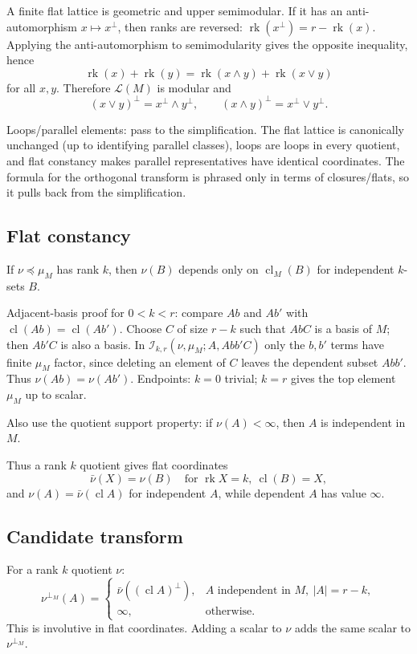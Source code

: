 \documentclass[12pt]{article}
\newcommand{\rk}{\operatorname{rk}}
\newcommand{\cl}{\operatorname{cl}}
\newcommand{\cL}{\mathcal L}
\begin{document}
A finite flat lattice is geometric and upper semimodular.  If it has
an anti-automorphism $x\mapsto x^\perp$, then ranks are reversed:
$\rk(x^\perp)=r-\rk(x)$.  Applying the anti-automorphism to
semimodularity gives the opposite inequality, hence
\[
\rk(x)+\rk(y)=\rk(x\wedge y)+\rk(x\vee y)
\]
for all $x,y$.  Therefore $\cL(M)$ is modular and
\[
(x\vee y)^\perp=x^\perp\wedge y^\perp,\qquad
(x\wedge y)^\perp=x^\perp\vee y^\perp.
\]

Loops/parallel elements: pass to the simplification.  The flat lattice
is canonically unchanged (up to identifying parallel classes), loops
are loops in every quotient, and flat constancy makes parallel
representatives have identical coordinates.  The formula for the
orthogonal transform is phrased only in terms of closures/flats, so it
pulls back from the simplification.

\subsection*{Flat constancy}

If $\nu\preceq\mu_M$ has rank $k$, then $\nu(B)$ depends only on
$\cl_M(B)$ for independent $k$-sets $B$.

Adjacent-basis proof for $0<k<r$: compare $A b$ and $A b'$ with
$\cl(A b)=\cl(A b')$.  Choose $C$ of size $r-k$ such that $A b C$ is
a basis of $M$; then $A b' C$ is also a basis.  In
$\mathcal I_{k,r}(\nu,\mu_M;A,A b b' C)$ only the $b,b'$ terms have
finite $\mu_M$ factor, since deleting an element of $C$ leaves the
dependent subset $A b b'$.  Thus $\nu(A b)=\nu(A b')$.  Endpoints:
$k=0$ trivial; $k=r$ gives the top element $\mu_M$ up to scalar.

Also use the quotient support property: if $\nu(A)<\infty$, then $A$
is independent in $M$.

Thus a rank $k$ quotient gives flat coordinates
\[
\bar\nu(X)=\nu(B)\quad\text{for }\rk X=k,\ \cl(B)=X,
\]
and $\nu(A)=\bar\nu(\cl A)$ for independent $A$, while dependent
$A$ has value $\infty$.

\subsection*{Candidate transform}

For a rank $k$ quotient $\nu$:
\[
\nu^{\perp_M}(A)=
\begin{cases}
\bar\nu((\cl A)^\perp),& A\text{ independent in }M,\ |A|=r-k,\\
\infty,&\text{otherwise}.
\end{cases}
\]
This is involutive in flat coordinates.  Adding a scalar to $\nu$
adds the same scalar to $\nu^{\perp_M}$.
\end{document}
